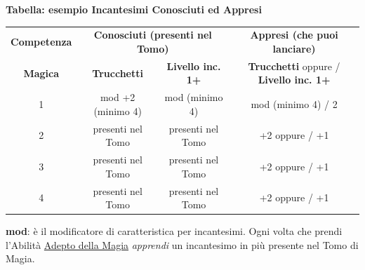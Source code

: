 \textbf{Tabella: esempio Incantesimi Conosciuti ed Appresi}

\medskip

\begin{tabular}{|c|c|c|c|}
\hline
\textbf{Competenza} & \multicolumn{2}{c|}{\textbf{Conosciuti (presenti nel Tomo)}} & \multicolumn{1}{c|}{\textbf{Appresi (che puoi lanciare)}} \\
\cline{2-4}
\textbf{Magica} & \textbf{Trucchetti} & \textbf{Livello inc. 1+} & \multicolumn{1}{c|}{\textbf{Trucchetti} oppure /  \textbf{Livello inc. 1+}} \\
\hline
1 & mod +2 (minimo 4) & mod (minimo 4) & mod (minimo 4) / 2 \\
\hline
2 & presenti nel Tomo & presenti nel Tomo & +2 oppure / +1 \\
\hline
3 & presenti nel Tomo & presenti nel Tomo & +2 oppure / +1 \\
\hline
4 & presenti nel Tomo & presenti nel Tomo & +2 oppure / +1 \\
\hline
\end{tabular}

\medskip

\textbf{mod}: è il modificatore di caratteristica per incantesimi. Ogni volta che prendi l'Abilità \hyperlink{adeptodellamagia}{Adepto della Magia} \emph{apprendi} un incantesimo in più presente nel Tomo di Magia.

